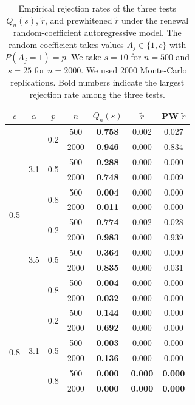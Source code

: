 \documentclass[10pt,a4paper]{amsart}
\numberwithin{equation}{section}
\begin{document}
\begin{table}[H]
\centering
\caption{Empirical rejection rates of the three tests $Q_n(s)$, $\tilde r$, and prewhitened $\tilde r$ under the renewal random-coefficient autoregressive model. The random coefficient takes values $A_j\in\{1,c\}$ with $P(A_j=1)=p$. We take $s=10$ for $n=500$ and $s=25$ for $n=2000$. We used 2000 Monte-Carlo replications. Bold numbers indicate the largest rejection rate among the three tests.}
\label{tab:three_tests_rejection_rates_renewal_rcar}
\begin{tabular}{ccccccc}
\hline
$c$ & $\alpha$ & $p$ & $n$ & $Q_n(s)$ & $\tilde r$ & PW $\tilde r$\\
\hline

\multirow{12}{*}{0.5}
& \multirow{6}{*}{3.1}
& \multirow{2}{*}{0.2}
& 500  & \textbf{0.758} & 0.002 & 0.027 \\
&  &  & 2000 & \textbf{0.946} & 0.000 & 0.834 \\
\cline{3-7}
&  & \multirow{2}{*}{0.5}
& 500  & \textbf{0.288} & 0.000 & 0.000 \\
&  &  & 2000 & \textbf{0.748} & 0.000 & 0.009 \\
\cline{3-7}
&  & \multirow{2}{*}{0.8}
& 500  & \textbf{0.004} & 0.000 & 0.000 \\
&  &  & 2000 & \textbf{0.011} & 0.000 & 0.000 \\
\cline{2-7}

& \multirow{6}{*}{3.5}
& \multirow{2}{*}{0.2}
& 500  & \textbf{0.774} & 0.002 & 0.028 \\
&  &  & 2000 & \textbf{0.983} & 0.000 & 0.939 \\
\cline{3-7}
&  & \multirow{2}{*}{0.5}
& 500  & \textbf{0.364} & 0.000 & 0.000 \\
&  &  & 2000 & \textbf{0.835} & 0.000 & 0.031 \\
\cline{3-7}
&  & \multirow{2}{*}{0.8}
& 500  & \textbf{0.004} & 0.000 & 0.000 \\
&  &  & 2000 & \textbf{0.032} & 0.000 & 0.000 \\
\hline

\multirow{12}{*}{0.8}
& \multirow{6}{*}{3.1}
& \multirow{2}{*}{0.2}
& 500  & \textbf{0.144} & 0.000 & 0.000 \\
&  &  & 2000 & \textbf{0.692} & 0.000 & 0.000 \\
\cline{3-7}
&  & \multirow{2}{*}{0.5}
& 500  & \textbf{0.003} & 0.000 & 0.000 \\
&  &  & 2000 & \textbf{0.136} & 0.000 & 0.000 \\
\cline{3-7}
&  & \multirow{2}{*}{0.8}
& 500  & \textbf{0.000} & \textbf{0.000} & \textbf{0.000} \\
&  &  & 2000 & \textbf{0.000} & \textbf{0.000} & \textbf{0.000} \\
\cline{2-7}


\end{tabular}
\end{table}
\end{document}
